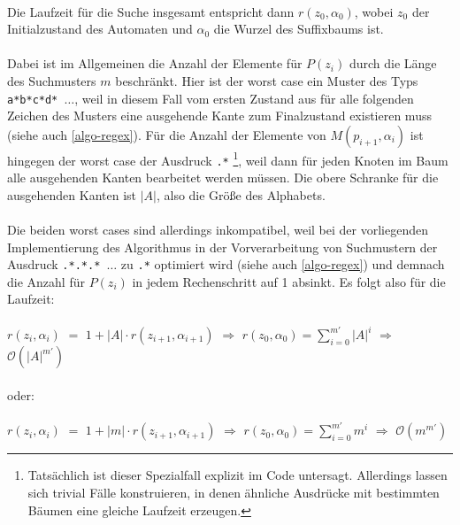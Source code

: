 \paragraph{} Die Laufzeit für die Suche insgesamt entspricht dann $r(z_0,\alpha_0)$, wobei $z_0$ der Initialzustand des Automaten und $\alpha_0$ die Wurzel des Suffixbaums ist.
\paragraph{} Dabei ist im Allgemeinen die Anzahl der Elemente für $P(z_i)$ durch die Länge des Suchmusters $m$ beschränkt. Hier ist der worst case ein Muster des Typs \texttt{a*b*c*d* $\dots$}, weil in diesem Fall vom ersten Zustand aus für alle folgenden Zeichen des Musters eine ausgehende Kante zum Finalzustand existieren muss (siehe auch \ref{algo-regex}). Für die Anzahl der Elemente von $M(p_{i+1},\alpha_i)$ ist hingegen der worst case der Ausdruck \texttt{.*} \footnote{Tatsächlich ist dieser Spezialfall explizit im Code untersagt. Allerdings lassen sich trivial Fälle konstruieren, in denen ähnliche Ausdrücke mit bestimmten Bäumen eine gleiche Laufzeit erzeugen.}, weil dann für jeden Knoten im Baum alle ausgehenden Kanten bearbeitet werden müssen. Die obere Schranke für die ausgehenden Kanten ist $|A|$, also die Größe des Alphabets.
\paragraph{} Die beiden worst cases sind allerdings inkompatibel, weil bei der vorliegenden Implementierung des Algorithmus in der Vorverarbeitung von Suchmustern der Ausdruck \texttt{.*.*.* $\dots$} zu \texttt{.*} optimiert wird (siehe auch \ref{algo-regex}) und demnach die Anzahl für $P(z_i)$ in jedem Rechenschritt auf 1 absinkt. Es folgt also für die Laufzeit:

\paragraph{} $r(z_i,\alpha_i)$ $=$ $1 + |A| \cdot r(z_{i+1},\alpha_{i+1})$ $\Rightarrow$ $r(z_0,\alpha_0) = \sum_{i=0}^{m'} |A|^i$ $\Rightarrow$ $\mathcal{O}(|A|^{m'})$

\paragraph{} oder:

\paragraph{} $r(z_i,\alpha_i)$ $=$ $1 + |m| \cdot r(z_{i+1},\alpha_{i+1})$ $\Rightarrow$ $r(z_0,\alpha_0) = \sum_{i=0}^{m'} m^i$ $\Rightarrow$ $\mathcal{O}(m^{m'})$

